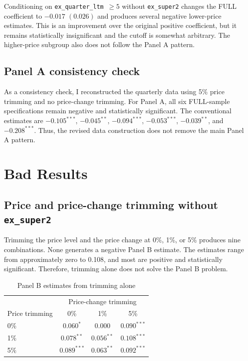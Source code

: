 \documentclass[12pt]{article}
\begin{document}
Conditioning on \texttt{ex\_quarter\_ltm $\geq 5$} without
\texttt{ex\_super2} changes the FULL coefficient to $-0.017$ $(0.026)$ and
produces several negative lower-price estimates. This is an improvement over
the original positive coefficient, but it remains statistically insignificant
and the cutoff is somewhat arbitrary. The higher-price subgroup also does not
follow the Panel A pattern.


\subsection{Panel A consistency check}

As a consistency check, I reconstructed the quarterly data using 5\% price
trimming and no price-change trimming. For Panel A, all six FULL-sample
specifications remain negative and statistically significant. The conventional
estimates are $-0.105^{***}$, $-0.045^{**}$, $-0.094^{***}$,
$-0.053^{***}$, $-0.039^{**}$, and $-0.208^{***}$. Thus, the revised data
construction does not remove the main Panel A pattern.


\section{Bad Results}

\subsection{Price and price-change trimming without \texttt{ex\_super2}}

Trimming the price level and the price change at 0\%, 1\%, or 5\% produces
nine combinations. None generates a negative Panel B estimate. The estimates
range from approximately zero to 0.108, and most are positive and statistically
significant. Therefore, trimming alone does not solve the Panel B problem.

\begin{table}[h]
\centering
\caption{Panel B estimates from trimming alone}
\label{tab:trim_only}
\begin{tabular}{lccc}
\hline
 & \multicolumn{3}{c}{Price-change trimming} \\
Price trimming & 0\% & 1\% & 5\% \\
\hline
0\% & $0.060^{*}$ & $0.000$ & $0.090^{***}$ \\
1\% & $0.078^{**}$ & $0.056^{**}$ & $0.108^{***}$ \\
5\% & $0.089^{***}$ & $0.063^{**}$ & $0.092^{***}$ \\
\hline
\end{tabular}
\end{table}
\end{document}
